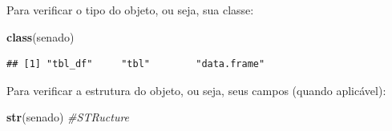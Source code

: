 \documentclass[]{book}
\newenvironment{Shaded}{\begin{snugshade}}{\end{snugshade}}
\newcommand{\KeywordTok}[1]{\textcolor[rgb]{0.13,0.29,0.53}{\textbf{#1}}}
\newcommand{\CommentTok}[1]{\textcolor[rgb]{0.56,0.35,0.01}{\textit{#1}}}
\newcommand{\NormalTok}[1]{#1}
\begin{document}
Para verificar o tipo do objeto, ou seja, sua classe:

\begin{Shaded}
\begin{Highlighting}[]
\KeywordTok{class}\NormalTok{(senado)}
\end{Highlighting}
\end{Shaded}

\begin{verbatim}
## [1] "tbl_df"     "tbl"        "data.frame"
\end{verbatim}

Para verificar a estrutura do objeto, ou seja, seus campos (quando
aplicável):

\begin{Shaded}
\begin{Highlighting}[]
\KeywordTok{str}\NormalTok{(senado) }\CommentTok{#STRucture}
\end{Highlighting}
\end{Shaded}
\end{document}
